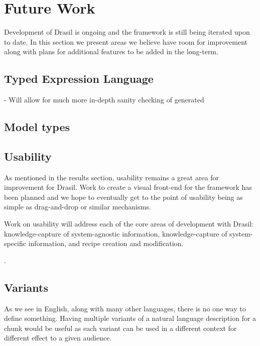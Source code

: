 \chapter{Future Work}
\label{c:future}

Development of Drasil is ongoing and the framework is still being iterated upon
to date. In this section we present areas we believe have room for improvement
along with plans for additional features to be added in the long-term.

\section{Typed Expression Language}
- Will allow for much more in-depth sanity checking of generated \sfs{}

\section{Model types}

\section{Usability}
As mentioned in the results section, usability remains a great area for
improvement for Drasil. Work to create a visual front-end for the framework
has been planned and we hope to eventually get to the point of usability being
as simple as drag-and-drop or similar mechanisms.

Work on usability will address each of the core areas of development with
Drasil: knowledge-capture of system-agnostic information,
knowledge-capture of system-specific information, and recipe creation and
modification.

.

\section{Variants} 


As we see in English, along with many other languages, there is no one way to 
define something. Having multiple variants of a natural language description 
for a chunk would be useful as each variant can be used in a different context 
for different effect to a given audience.

